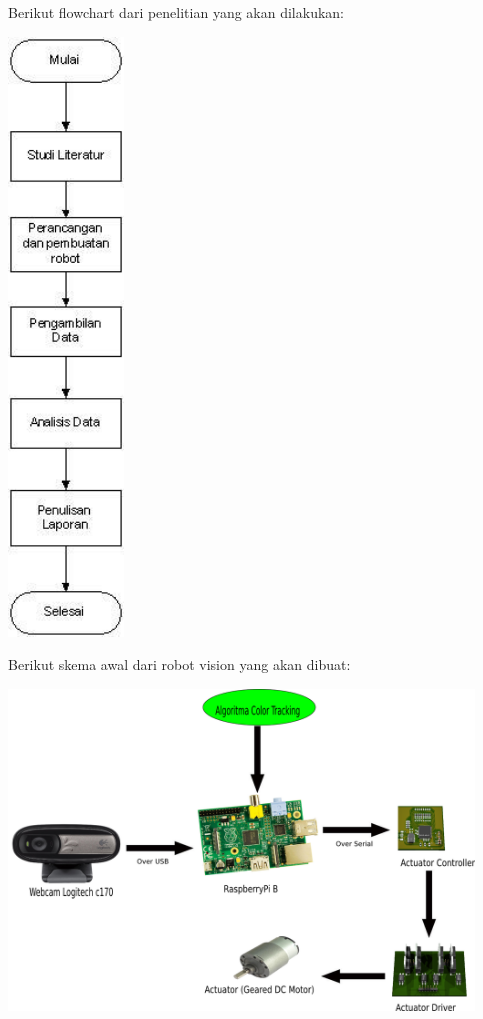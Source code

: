 \documentclass[a4paper,12pt]{article}
\begin{document}
Berikut flowchart dari penelitian yang akan dilakukan:

\begin{center}
 \includegraphics[height=450pt]{flow}
\end{center}

\vspace{40pt}

Berikut skema awal dari robot vision yang akan dibuat:

\begin{center}
 \includegraphics[width=350pt]{desain_awal}
\end{center}
\end{document}
